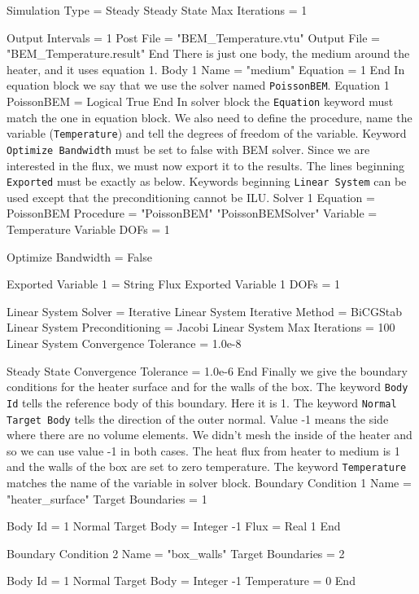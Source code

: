   Simulation Type = Steady
  Steady State Max Iterations = 1

  Output Intervals = 1
  Post File = "BEM_Temperature.vtu"
  Output File = "BEM_Temperature.result"
End
\ttend
There is just one body, the medium around the heater, and it uses equation 1.
\ttbegin
Body 1
  Name = "medium"
  Equation = 1
End
\ttend
In equation block we say that we use the solver named {\tt PoissonBEM}.
\ttbegin
Equation 1
  PoissonBEM = Logical True
End
\ttend
In solver block the {\tt Equation} keyword must match the one in equation block.
We also need to define the procedure, name the variable ({\tt Temperature}) and tell 
the degrees of freedom of the variable. Keyword {\tt Optimize Bandwidth} must be set to false
with BEM solver. Since we are interested in the flux, we must now export it to the
results. The lines beginning {\tt Exported} must be exactly as below. Keywords beginning
{\tt Linear System} can be used except that the preconditioning cannot be ILU.
\ttbegin
Solver 1
  Equation = PoissonBEM
  Procedure = "PoissonBEM" "PoissonBEMSolver"
  Variable = Temperature
  Variable DOFs = 1

  Optimize Bandwidth = False

  Exported Variable 1 = String Flux
  Exported Variable 1 DOFs = 1

  Linear System Solver = Iterative
  Linear System Iterative Method = BiCGStab
  Linear System Preconditioning = Jacobi
  Linear System Max Iterations = 100
  Linear System Convergence Tolerance = 1.0e-8

  Steady State Convergence Tolerance = 1.0e-6
End
\ttend
Finally we give the boundary conditions for the heater surface and for the walls of the 
box. The keyword {\tt Body Id} tells the reference body of this boundary. Here it is 1. 
The keyword {\tt Normal Target Body} tells the direction of the outer normal. Value -1 
means the side where there are no volume elements. We didn't mesh the inside of 
the heater and so we can use value -1 in both cases. The heat flux from heater to
medium is 1 and the walls of the box are set to zero temperature. The keyword
{\tt Temperature} matches the name of the variable in solver block.
\ttbegin
Boundary Condition 1
  Name = "heater_surface"
  Target Boundaries = 1

  Body Id = 1
  Normal Target Body = Integer -1
  Flux = Real 1
End

Boundary Condition 2
  Name = "box_walls"
  Target Boundaries = 2

  Body Id = 1
  Normal Target Body = Integer -1
  Temperature = 0
End
\ttend
